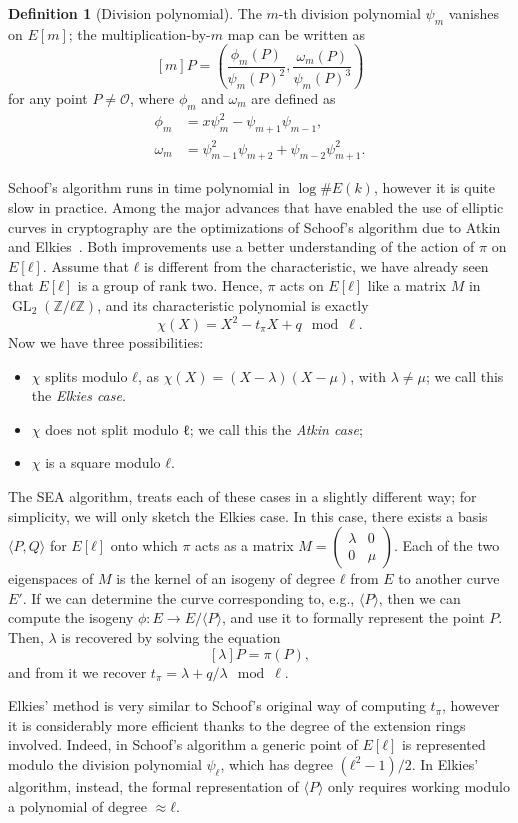 \documentclass[10pt]{article}
\theoremstyle{plain}
\theoremstyle{definition}
\newtheorem{definition}[theorem]{Definition}
\DeclareMathOperator{\GL}{GL}
\def\O{\ensuremath{\mathcal{O}}}
\begin{document}
\begin{prposition}
\begin{definition}[Division polynomial]
  The $m$-th division polynomial $ψ_m$ vanishes on $E[m]$;
  the multiplication-by-$m$ map can be written as
  \[[m]P = \left(\frac{ϕ_m(P)}{ψ_m(P)^2}, \frac{ω_m(P)}{ψ_m(P)^3}\right)\]
  for any point $P≠\O$, where $ϕ_m$ and $ω_m$ are defined as
  \begin{align*}
    ϕ_m &= xψ_m^2 - ψ_{m+1}ψ_{m-1},\\
    ω_m &= ψ_{m-1}^2ψ_{m+2} + ψ_{m-2}ψ_{m+1}^2.
  \end{align*}
\end{definition}

Schoof's algorithm runs in time polynomial in $\log\#E(k)$, however it
is quite slow in practice. %
Among the major advances that have enabled the use of elliptic curves
in cryptography are the optimizations of Schoof's algorithm due to
Atkin and Elkies~\cite{atkin91,elkies92,schoof95,elkies98}. %
Both improvements use a better understanding of the action of $π$ on
$E[ℓ]$. %
Assume that $ℓ$ is different from the characteristic, we have already
seen that $E[ℓ]$ is a group of rank two. %
Hence, $π$ acts on $E[ℓ]$ like a matrix $M$ in $\GL_2(ℤ/ℓℤ)$, and its
characteristic polynomial is exactly
\[χ(X) = X^2 - t_πX + q \mod \ell.\] %
Now we have three possibilities:
\begin{itemize}
\item $χ$ splits modulo $ℓ$, as $χ(X) = (X-λ)(X-μ)$, with $λ≠μ$; we call
  this the \emph{Elkies case}.
\item $χ$ does not split modulo ℓ; we call this the \emph{Atkin case};
\item $χ$ is a square modulo $ℓ$.
\end{itemize}

The SEA algorithm, treats each of these cases in a slightly different
way; for simplicity, we will only sketch the Elkies case. %
In this case, there exists a basis $〈P,Q〉$ for $E[ℓ]$ onto which $π$
acts as a matrix
$M=\left(\begin{smallmatrix}λ&0\\0&μ\end{smallmatrix}\right)$. %
Each of the two eigenspaces of $M$ is the kernel of an isogeny of
degree $ℓ$ from $E$ to another curve $E'$. %
If we can determine the curve corresponding to, e.g., $〈P〉$, then we
can compute the isogeny $ϕ:E\to E/〈P〉$, and use it to formally
represent the point $P$. %
Then, $λ$ is recovered by solving the equation
\[[λ]P = π(P),\]
and from it we recover $t_π = λ + q/λ \mod \ell$.

Elkies' method is very similar to Schoof's original way of computing
$t_π$, however it is considerably more efficient thanks to the degree
of the extension rings involved. %
Indeed, in Schoof's algorithm a generic point of $E[ℓ]$ is represented
modulo the division polynomial $ψ_ℓ$, which has degree $(ℓ^2-1)/2$. %
In Elkies' algorithm, instead, the formal representation of $〈P〉$
only requires working modulo a polynomial of degree $≈ℓ$.


\end{prposition}
\end{document}
